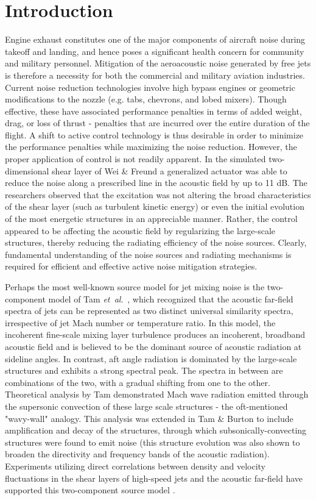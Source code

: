 \documentclass[english]{aiaa-tc}
\newcommand*{\etal}{\textit{et~al}.\ }
\begin{document}
\section{Introduction}
Engine exhaust constitutes one of the major components of aircraft noise during takeoff and landing, and hence poses a significant health concern for community and military personnel.
Mitigation of the aeroacoustic noise generated by free jets is therefore a necessity for both the commercial and military aviation industries.
Current noise reduction technologies involve high bypass engines or geometric modifications to the nozzle (e.g. tabs, chevrons, and lobed mixers).
Though effective, these have associated performance penalties in terms of added weight, drag, or loss of thrust - penalties that are incurred over the entire duration of the flight.
A shift to active control technology is thus desirable in order to minimize the performance penalties while maximizing the noise reduction.
However, the proper application of control is not readily apparent.
In the simulated two-dimensional shear layer of Wei \& Freund \cite{Wei2006} a generalized actuator was able to reduce the noise along a prescribed line in the acoustic field by up to 11 dB.
The researchers observed that the excitation was not altering the broad characteristics of the shear layer (such as turbulent kinetic energy) or even the initial evolution of the most energetic structures in an appreciable manner.
Rather, the control appeared to be affecting the acoustic field by regularizing the large-scale structures, thereby reducing the radiating efficiency of the noise sources.
Clearly, fundamental understanding of the noise sources and radiating mechanisms is required for efficient and effective active noise mitigation strategies.

Perhaps the most well-known source model for jet mixing noise is the two-component model of Tam \etal \cite{Tam1996}, which recognized that the acoustic far-field spectra of jets can be represented as two distinct universal similarity spectra, irrespective of jet Mach number or temperature ratio.
In this model, the incoherent fine-scale mixing layer turbulence produces an incoherent, broadband acoustic field and is believed to be the dominant source of acoustic radiation at sideline angles.
In contrast, aft angle radiation is dominated by the large-scale structures and exhibits a strong spectral peak.
The spectra in between are combinations of the two, with a gradual shifting from one to the other.
Theoretical analysis by Tam \cite{Tam1971} demonstrated Mach wave radiation emitted through the supersonic convection of these large scale structures - the oft-mentioned "wavy-wall" analogy.
This analysis was extended in Tam \& Burton \cite{Tam1984} to include amplification and decay of the structures, through which subsonically-convecting structures were found to emit noise (this structure evolution was also shown to broaden the directivity and frequency bands of the acoustic radiation).
Experiments utilizing direct correlations between density and velocity fluctuations in the shear layers of high-speed jets and the acoustic far-field have supported this two-component source model \cite{Panda2002,Panda2005b}.
\end{document}
